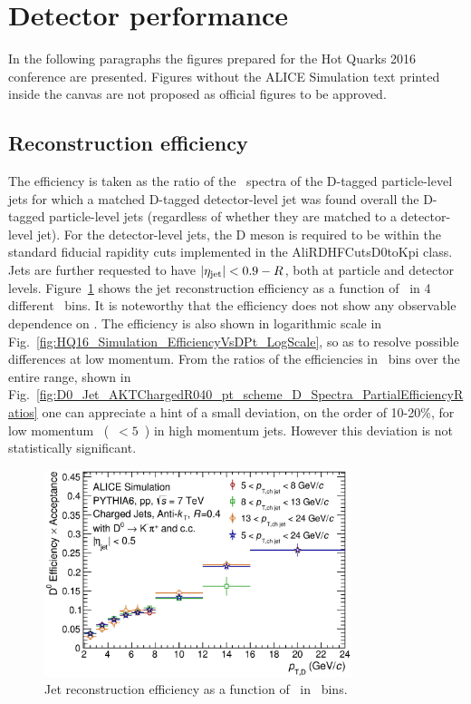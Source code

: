 \section{Detector performance}
In the following paragraphs the figures prepared for the Hot Quarks 2016 conference are presented. Figures without the ALICE Simulation
text printed inside the canvas are not proposed as official figures to be approved.
\subsection{Reconstruction efficiency}
The efficiency is taken as the ratio of the \ptd\ spectra of the D-tagged particle-level jets for which a matched
D-tagged detector-level jet was found overall the D-tagged particle-level jets (regardless of whether they are matched to a detector-level jet).
For the detector-level jets, the D meson is required to be within the standard fiducial rapidity cuts implemented in the AliRDHFCutsD0toKpi class.
Jets are further requested to have $|\eta_{\rm jet}| < 0.9 - R$, both at particle and detector levels.
Figure~\ref{fig:HQ16_Simulation_EfficiencyVsDPt} shows the jet reconstruction efficiency as a function of \ptd\ in 4 different \ptchjet\ bins.
It is noteworthy that the efficiency does not show any observable dependence on \ptchjet.
The efficiency is also shown in logarithmic scale in Fig.~\ref{fig:HQ16_Simulation_EfficiencyVsDPt_LogScale}, so as to resolve possible
differences at low momentum. From the ratios of the efficiencies in \ptchjet\ bins over the entire range, shown in Fig.~\ref{fig:D0_Jet_AKTChargedR040_pt_scheme_D_Spectra_PartialEfficiencyRatios}
one can appreciate a hint of a small deviation, on the order of 10-20\%, for low momentum \Dzero\ (\ptd~$<5$~\GeVc) in high momentum jets. However this deviation is not statistically significant.
\begin{figure}[tbh]
\begin{center}
\includegraphics[width=0.8\textwidth]{img/HQ16_Simulation_EfficiencyVsDPt}
 \caption{Jet reconstruction efficiency as a function of \ptd\ in \ptchjet\ bins.} 
 \label{fig:HQ16_Simulation_EfficiencyVsDPt}
\end{center}
\end{figure}

